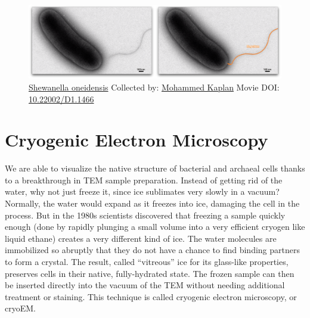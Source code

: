 \documentclass[]{tufte-book}
\begin{document}
\begin{figure}
\includegraphics{movie_stills/1_4} \caption[\protect\hyperlink{tree}{Shewanella oneidensis} Collected by:
\protect\hyperlink{mohammed_kaplan}{Mohammed Kaplan} Movie DOI:
\href{https://doi.org/10.22002/D1.1466}{10.22002/D1.1466}]{\protect\hyperlink{tree}{Shewanella oneidensis} Collected by:
\protect\hyperlink{mohammed_kaplan}{Mohammed Kaplan} Movie DOI:
\href{https://doi.org/10.22002/D1.1466}{10.22002/D1.1466}}\label{fig:1-4}
\end{figure}

\section{Cryogenic Electron
Microscopy}\label{cryogenic-electron-microscopy}

We are able to visualize the native structure of bacterial and archaeal
cells thanks to a breakthrough in TEM sample preparation. Instead of
getting rid of the water, why not just freeze it, since ice sublimates
very slowly in a vacuum? Normally, the water would expand as it freezes
into ice, damaging the cell in the process. But in the 1980s scientists
discovered that freezing a sample quickly enough (done by rapidly
plunging a small volume into a very efficient cryogen like liquid
ethane) creates a very different kind of ice. The water molecules are
immobilized so abruptly that they do not have a chance to find binding
partners to form a crystal. The result, called ``vitreous'' ice for its
glass-like properties, preserves cells in their native, fully-hydrated
state. The frozen sample can then be inserted directly into the vacuum
of the TEM without needing additional treatment or staining. This
technique is called cryogenic electron microscopy, or cryoEM.
\end{document}
